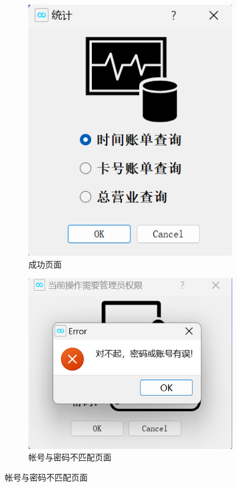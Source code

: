 \documentclass{article}
\begin{document}
    \begin{figure}[htbp]
        \centering
        \begin{subfigure}{0.45\linewidth}
            \centering
            \includegraphics[scale=0.5]{figure/count.png}
            \caption{成功页面}
            \label{admin_success}
        \end{subfigure}
        \centering
        \begin{subfigure}{0.5\linewidth}
            \centering
            \includegraphics[scale=0.5]{figure/admin_error.png}
            \caption{帐号与密码不匹配页面}
            \label{admin_id_password_error}
        \end{subfigure}
    \end{figure}
\end{document}
